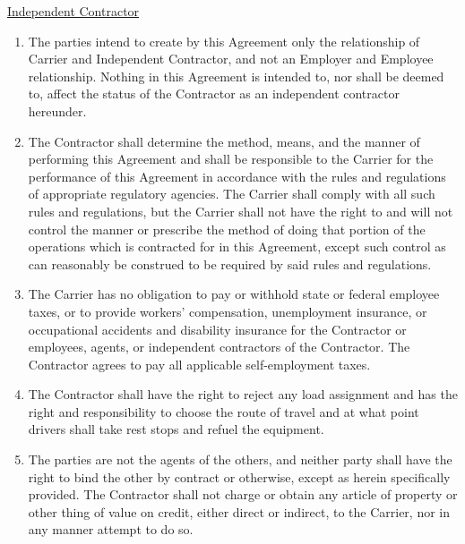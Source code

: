 \underline{Independent Contractor}
\begin{enumerate}[
    ref = \SecondLevelEnumerator
]
    \item The parties intend to create by this Agreement only the
    relationship of Carrier and Independent Contractor, and not an Employer
    and Employee relationship. Nothing in this Agreement is intended to,
    nor shall be deemed to, affect the status of the Contractor as an
    independent contractor hereunder.

    \item The Contractor shall determine the method, means, and the manner
    of performing this Agreement and shall be responsible to the Carrier
    for the performance of this Agreement in accordance with the rules and
    regulations of appropriate regulatory agencies. The Carrier shall
    comply with all such rules and regulations, but the Carrier shall not
    have the right to and will not control the manner or prescribe the
    method of doing that portion of the operations which is contracted for
    in this Agreement, except such control as can reasonably be construed
    to be required by said rules and regulations.

    \item The Carrier has no obligation to pay or withhold state or federal
    employee taxes, or to provide workers' compensation, unemployment
    insurance, or occupational accidents and disability insurance for the
    Contractor or employees, agents, or independent contractors of the
    Contractor. The Contractor agrees to pay all applicable self-employment
    taxes.

    \item The Contractor shall have the right to reject any load assignment
    and has the right and responsibility to choose the route of travel and
    at what point drivers shall take rest stops and refuel the equipment.

    \item The parties are not the agents of the others, and neither party
    shall have the right to bind the other by contract or otherwise, except
    as herein specifically provided. The Contractor shall not charge or
    obtain any article of property or other thing of value on credit,
    either direct or indirect, to the Carrier, nor in any manner attempt to
    do so.
\end{enumerate}